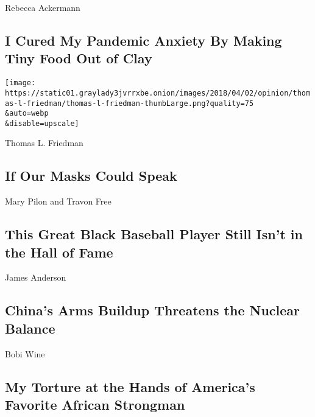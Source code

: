 Rebecca Ackermann

\hypertarget{i-cured-my-pandemic-anxiety-by-making-tiny-food-out-of-clay}{%
\subsection{I Cured My Pandemic Anxiety By Making Tiny Food Out of
Clay}\label{i-cured-my-pandemic-anxiety-by-making-tiny-food-out-of-clay}}

\href{/2020/07/28/opinion/coronavirus-masks.html}{}

\texttt{[image: https://static01.graylady3jvrrxbe.onion/images/2018/04/02/opinion/thomas-l-friedman/thomas-l-friedman-thumbLarge.png?quality=75\\\&auto=webp\\\&disable=upscale]}

Thomas L. Friedman

\hypertarget{if-our-masks-could-speak}{%
\subsection{If Our Masks Could Speak}\label{if-our-masks-could-speak}}

\href{/2020/07/29/opinion/john-donaldson-baseball-black-players.html}{}

Mary Pilon and Travon Free

\hypertarget{this-great-black-baseball-player-still-isnt-in-the-hall-of-fame}{%
\subsection{This Great Black Baseball Player Still Isn't in the Hall of
Fame}\label{this-great-black-baseball-player-still-isnt-in-the-hall-of-fame}}

\href{/2020/07/29/opinion/russia-china-nuclear-weapons.html}{}

James Anderson

\hypertarget{chinas-arms-buildup-threatens-the-nuclear-balance}{%
\subsection{China's Arms Buildup Threatens the Nuclear
Balance}\label{chinas-arms-buildup-threatens-the-nuclear-balance}}

\href{/2020/07/29/opinion/uganda-museveni-repression.html}{}

Bobi Wine

\hypertarget{my-torture-at-the-hands-of-americas-favorite-african-strongman}{%
\subsection{My Torture at the Hands of America's Favorite African
Strongman}\label{my-torture-at-the-hands-of-americas-favorite-african-strongman}}

